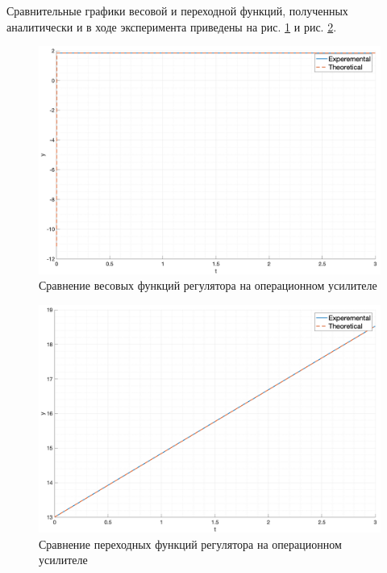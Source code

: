 Сравнительные графики весовой и переходной функций, полученных аналитически и в ходе эксперимента  приведены на рис. \ref{fig:task5_impulse_response_cmp} и рис. \ref{fig:task5_step_response_cmp}.
\begin{figure}[ht!]
    \centering
    \includegraphics[width=\textwidth]{media/plots/task5_impulse_response_cmp.png}
    \caption{Сравнение весовых функций регулятора на операционном усилителе}
    \label{fig:task5_impulse_response_cmp}
\end{figure}
\begin{figure}[ht!]
    \centering
    \includegraphics[width=\textwidth]{media/plots/task5_step_response_cmp.png}
    \caption{Сравнение переходных функций регулятора на операционном усилителе}
    \label{fig:task5_step_response_cmp}
\end{figure}

\FloatBarrier
